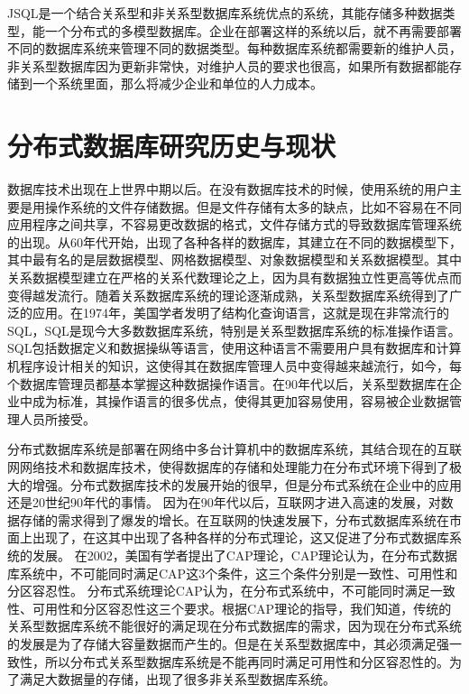 	JSQL是一个结合关系型和非关系型数据库系统优点的系统，其能存储多种数据类型，能一个分布式的多模型数据库。企业在部署这样的系统以后，就不再需要部署不同的数据库系统来管理不同的数据类型。每种数据库系统都需要新的维护人员，非关系型数据库因为更新非常快，对维护人员的要求也很高，如果所有数据都能存储到一个系统里面，那么将减少企业和单位的人力成本。
\section{分布式数据库研究历史与现状}
数据库技术出现在上世界中期以后。在没有数据库技术的时候，使用系统的用户主要是用操作系统的文件存储数据。但是文件存储有太多的缺点，比如不容易在不同应用程序之间共享，不容易更改数据的格式，文件存储方式的导致数据库管理系统的出现。从60年代开始，出现了各种各样的数据库，其建立在不同的数据模型下，其中最有名的是层数据模型、网格数据模型、对象数据模型和关系数据模型。其中关系数据模型建立在严格的关系代数理论之上，因为具有数据独立性更高等优点而变得越发流行。随着关系数据库系统的理论逐渐成熟，关系型数据库系统得到了广泛的应用。在1974年，美国学者发明了结构化查询语言，这就是现在非常流行的SQL，SQL是现今大多数数据库系统，特别是关系型数据库系统的标准操作语言。SQL包括数据定义和数据操纵等语言，使用这种语言不需要用户具有数据库和计算机程序设计相关的知识，这使得其在数据库管理人员中变得越来越流行，如今，每个数据库管理员都基本掌握这种数据操作语言。在90年代以后，关系型数据库在企业中成为标准，其操作语言的很多优点，使得其更加容易使用，容易被企业数据管理人员所接受。

分布式数据库系统是部署在网络中多台计算机中的数据库系统，其结合现在的互联网网络技术和数据库技术，使得数据库的存储和处理能力在分布式环境下得到了极大的增强。分布式数据库技术的发展开始的很早，但是分布式系统在企业中的应用还是20世纪90年代的事情。
因为在90年代以后，互联网才进入高速的发展，对数据存储的需求得到了爆发的增长。在互联网的快速发展下，分布式数据库系统在市面上出现了，在这其中出现了各种各样的分布式理论，这又促进了分布式数据库系统的发展。 在2002，美国有学者提出了CAP理论，CAP理论认为，在分布式数据库系统中，不可能同时满足CAP这3个条件，这三个条件分别是一致性、可用性和分区容忍性。 分布式系统理论CAP认为，在分布式系统中，不可能同时满足一致性、可用性和分区容忍性这三个要求。根据CAP理论的指导，我们知道，传统的关系型数据库系统不能很好的满足现在分布式数据库的需求，因为现在分布式系统的发展是为了存储大容量数据而产生的。但是在关系型数据库中，其必须满足强一致性，所以分布式关系型数据库系统是不能再同时满足可用性和分区容忍性的。为了满足大数据量的存储，出现了很多非关系型数据库系统。

